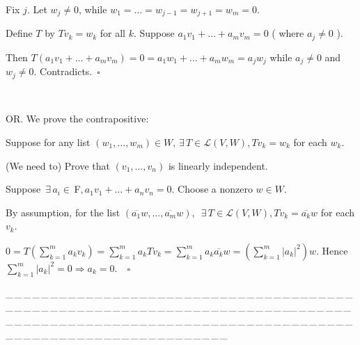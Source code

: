 \documentclass[a4paper, 11pt, UTF8]{article}
\def\Lm{\mathcal{L}}
\def\Fbfc{$\,{\timesbf F}$}
\begin{document}
\begin{large}
Fix $j$. Let $w_j\neq 0$, while $w_1=\dots=w_{j-1}=w_{j+1}=w_m=0.$\par\quad
Define $T$ by $Tv_k=w_k$ for all $k$. Suppose $a_1 v_1+\dots+a_m v_m=0$ ( where $a_j\neq 0$ ).\par\quad
Then $T(a_1 v_1+\dots+a_m v_m)=0=a_1 w_1+\dots+a_m w_m=a_j w_j$ while $a_j\neq 0$ and $w_j\neq 0.$ Contradicts.$\,\,\,\square$\par{\tiny\,\par}\quad
O{\small R.} We prove the contrapositive:\par\qquad
Suppose for any list $(w_1,\dots,w_m)\in W,\,\exists\,T\in\Lm(V,W),Tv_k=w_k$  for each $w_k.$\par\qquad
(We need to) Prove that $(v_1,\dots,v_n)$ is linearly independent.\par\quad
Suppose $\,\exists\,a_i\in\Fbfc,a_1 v_1+\dots+a_n v_n=0.$ Choose a nonzero $w\in W.$\par\quad
By assumption, for the list $(\overline{a_1}w,\dots,\overline{a_m}w),$ $\,\exists\,T\in\Lm(V,W),Tv_k=\overline{a_k}w$ for each $v_k.$\par\quad
$0=T(\sum\limits_{k=1}^m a_k v_k)=\sum\limits_{k=1}^m a_k Tv_k=\sum\limits_{k=1}^m a_k\overline{a_k}w=(\sum\limits_{k=1}^m |a_k|^2)w.$ Hence $\sum\limits_{k=1}^m|a_k|^2=0\Rightarrow a_k=0.\quad\square$\par
{\tiny \_\,\_\,\_\,\_\,\_\,\_\,\_\,\_\,\_\,\_\,\_\,\_\,\_\,\_\,\_\,\_\,\_\,\_\,\_\,\_\,\_\,\_\,\_\,\_\,\_\,\_\,\_\,\_\,\_\,\_\,\_\,\_\,\_\,\_\,\_\,\_\,\_\,\_\,\_\,\_\,\_\,\_\,\_\,\_\,\_\,\_\,\_\,\_\,\_\,\_\,\_\,\_\,\_\,\_\,\_\,\_\,\_\,\_\,\_\,\_\,\_\,\_\,\_\,\_\,\_\,\_\,\_\,\_\,\_\,\_\,\_\_\,\_\,\_\,\_\,\_\,\_\,\_\,\_\,\_\,\_\,\_\,\_\,\_\,\_\,\_\,\_\,\_\,\_\,\_\,\_\,\_\,\_\,\_\,\_\,\_\,\_\,\_\,\_\,\_\,\_\,\_\,\_\,\_\,\_\,\_\,\_\,\_\,\_\,\_\,\_\,\_\,\_\,\_\,\_\,\_\,\_\,\_\,\_\,\_\,\_\,\_\,\_\,\_\,\_\,\_\,\_\,\_\,\_\,\_\,\_\,\_\,\_\,\_\,\_\,\_\,\_\,\_\,\_\,\_\,\_\,\_}\par


\end{large}
\end{document}
